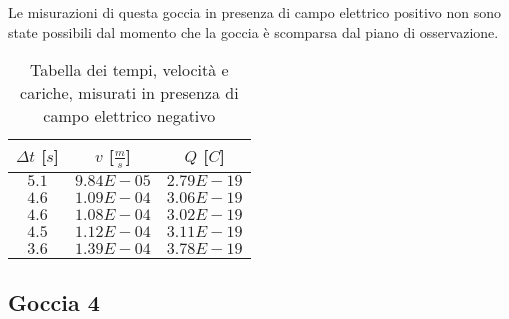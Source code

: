 \documentclass{article}
\begin{document}
\begin{multicols}{2}

Le misurazioni di questa goccia in presenza di campo elettrico positivo non sono state possibili dal momento che la goccia è scomparsa dal piano di osservazione.

\columnbreak

\begin{table}[H]
	\centering
	\begin{tabular}{| c | c | c |}
		\hline
		$\Delta t$ [$s$] & $v$ [$\frac ms$] & $Q$ [$C$] \\
		\hline
		$5.1$ & $9.84E-05$ & $2.79E-19$ \\
		$4.6$ & $1.09E-04$ & $3.06E-19$ \\
		$4.6$ & $1.08E-04$ & $3.02E-19$ \\
		$4.5$ & $1.12E-04$ & $3.11E-19$ \\
		$3.6$ & $1.39E-04$ & $3.78E-19$ \\
		\hline		
	\end{tabular}
	\caption{Tabella dei tempi, velocità e cariche, misurati in presenza di campo elettrico negativo}
	\label{}
\end{table}
	
\end{multicols}

\subsection{Goccia 4}
\end{document}
